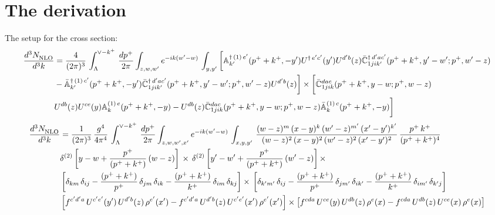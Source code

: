\documentclass[9pt]{article}
\def\mf#1{\mathbb{#1}}
\numberwithin{equation}{section}
\begin{document}
\section{The derivation}
The setup for the cross section:
\begin{align}
    \frac{d^{3}N_{\rm NLO}^{\rm}}{d^{3}k}  & = \frac{4}{(2\pi)^{3}}\,\int_{\Lambda}^{\vee-k^{+}}\, \frac{dp^{+}}{2\pi}\int_{z,w,w^{\prime}} e^{-ik(w^{\prime}-w)}\,  \int_{y,y^{\prime}}\bigg[\mf{A}^{\dagger\, (1)\,e^{\prime}}_{k^{\prime}}(p^{+}+k^{+},-y^{\prime})U^{\dagger\, e^{\prime}c^{\prime}}(y^{\prime})U^{d^{\prime}b}(z) \Bar{\mf{C}}^{\dagger\, d^{\prime}ac^{\prime}}_{1jik^{\prime}}(p^{+}+k^{+},y^{\prime}-w^{\prime}; p^{+},w^{\prime}-z) \notag \\ &  -\Bar{\mf{A}}^{\dagger\, (1)\,c^{\prime}}_{k^{\prime}}(p^{+}+k^{+},-y^{\prime}) \Bar{\mf{C}}^{\dagger\, d^{\prime}ac^{\prime}}_{1jik^{\prime}}(p^{+}+k^{+},y^{\prime}-w^{\prime}; p^{+},w^{\prime}-z)U^{d^{\prime}b}(z)\bigg]\times\bigg[\Bar{\mf{C}}^{dac}_{1jik}(p^{+}+k^{+},y-w; p^{+},w-z)\notag \\ & U^{db}(z)U^{ce}(y) \mf{A}^{(1)\,e}_{k}(p^{+}+k^{+},-y) -U^{db}(z) \Bar{\mf{C}}^{dac}_{1jik}(p^{+}+k^{+},y-w; p^{+},w-z)\Bar{\mf{A}}^{(1)\,c}_{k}(p^{+}+k^{+},-y)\bigg]\nonumber
\end{align}
\begin{align} \label{eq: first}
     \frac{d^{3}N_{\rm NLO}^{\rm}}{d^{3}k}  & = \frac{1}{(2\pi)^{3}}\,\frac{g^{4}}{4\pi^{4}}\,\int_{\Lambda}^{\vee-k^{+}}\, \frac{dp^{+}}{2\pi}\int_{z,w,w^{\prime},x'} e^{-ik(w^{\prime}-w)}\,  \int_{x,y,y^{\prime}}\,\frac{(w-z)^{m}\,(x-y)^{k}\,(w'-z)^{m'}\,(x'-y')^{k'}}{(w-z)^{2}\,(x-y)^{2}\,(w'-z)^{2}\,(x'-y')^{2}}\,\frac{p^{+}\,k^{+}}{(p^{+}+k^{+})^{4}}\notag \\ & \delta^{(2)}\left[y-w+\frac{p^{+}}{(p^{+}+k^{+})}\,(w-z)\right]\,\times\, \delta^{(2)}\left[y'-w'+\frac{p^{+}}{(p^{+}+k^{+})}\,(w'-z)\right]\times\notag \\ &  \left[\delta_{km}\,\delta_{ij}-\frac{(p^{+}+k^{+})}{p^{+}}\,\delta_{jm}\,\delta_{ik}-\frac{(p^{+}+k^{+})}{k^{+}}\,\delta_{im}\,\delta_{kj}\right]\times\, \left[\delta_{k'm'}\,\delta_{ij}-\frac{(p^{+}+k^{+})}{p^{+}}\,\delta_{jm'}\,\delta_{ik'}-\frac{(p^{+}+k^{+})}{k^{+}}\,\delta_{im'}\,\delta_{k'j}\right]\notag \\ & \left[f^{c'd'a}\,U^{c'e'}(y')\,U^{d'b}(z)\,\rho^{e'}(x')-f^{c'd'a}\,
    U^{d'b}(z)\,U^{c'e'}(x')\,\rho^{e'}(x')\right]\times \left[f^{cda}\,U^{ce}(y)\,U^{db}(z)\,\rho^{e}(x)-f^{cda}\,
    U^{db}(z)\,U^{ce}(x)\,\rho^{e}(x)\right]
\end{align}
\end{document}
